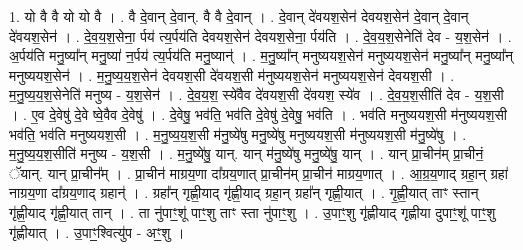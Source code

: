 \documentclass[17pt]{extarticle}
\begin{document}
1. यो वै वै यो यो वै । . वै दे॒वान् दे॒वान्. वै वै दे॒वान् । . दे॒वान् दे॑वयश॒सेन॑ देवयश॒सेन॑ दे॒वान् दे॒वान् दे॑वयश॒सेन॑ । . दे॒व॒य॒श॒सेना॒ र्पय॑ त्य॒र्पय॑ति देवयश॒सेन॑ देवयश॒सेना॒ र्पय॑ति । . दे॒व॒य॒श॒सेनेति॑ देव - य॒श॒सेन॑ । . अ॒र्पय॑ति मनु॒ष्या᳚न् मनु॒ष्या॑ न॒र्पय॑ त्य॒र्पय॑ति मनु॒ष्यान्॑ । . म॒नु॒ष्या᳚न् मनुष्ययश॒सेन॑ मनुष्ययश॒सेन॑ मनु॒ष्या᳚न् मनु॒ष्या᳚न् मनुष्ययश॒सेन॑ । . म॒नु॒ष्य॒य॒श॒सेन॑ देवयश॒सी दे॑वयश॒सी म॑नुष्ययश॒सेन॑ मनुष्ययश॒सेन॑ देवयश॒सी । . म॒नु॒ष्य॒य॒श॒सेनेति॑ मनुष्य - य॒श॒सेन॑ । . दे॒व॒य॒श॒ स्ये॑वैव दे॑वयश॒सी दे॑वयश॒ स्ये॑व । . दे॒व॒य॒श॒सीति॑ देव - य॒श॒सी । . ए॒व दे॒वेषु॑ दे॒वे ष्वे॒वैव दे॒वेषु॑ । . दे॒वेषु॒ भव॑ति॒ भव॑ति दे॒वेषु॑ दे॒वेषु॒ भव॑ति । . भव॑ति मनुष्ययश॒सी म॑नुष्ययश॒सी भव॑ति॒ भव॑ति मनुष्ययश॒सी । . म॒नु॒ष्य॒य॒श॒सी म॑नु॒ष्ये॑षु मनु॒ष्ये॑षु मनुष्ययश॒सी म॑नुष्ययश॒सी म॑नु॒ष्ये॑षु । . म॒नु॒ष्य॒य॒श॒सीति॑ मनुष्य - य॒श॒सी । . म॒नु॒ष्ये॑षु॒ यान्. यान् म॑नु॒ष्ये॑षु मनु॒ष्ये॑षु॒ यान् । . यान् प्रा॒चीन॑म् प्रा॒चीनं॒ ॅयान्. यान् प्रा॒चीन᳚म् । . प्रा॒चीन॑ माग्रय॒णा दा᳚ग्रय॒णात् प्रा॒चीन॑म् प्रा॒चीन॑ माग्रय॒णात् । . आ॒ग्र॒य॒णाद् ग्रहा॒न् ग्रहा॑ नाग्रय॒णा दा᳚ग्रय॒णाद् ग्रहान्॑ । . ग्रहा᳚न् गृह्णी॒याद् गृ॑ह्णी॒याद् ग्रहा॒न् ग्रहा᳚न् गृह्णी॒यात् । . गृ॒ह्णी॒यात् ताꣳ स्तान् गृ॑ह्णी॒याद् गृ॑ह्णी॒यात् तान् । . ता नु॑पाꣳ॒॒शू॑ पाꣳ॒॒शु ताꣳ स्ता नु॑पाꣳ॒॒शु । . उ॒पाꣳ॒॒शु गृ॑ह्णीयाद् गृह्णीया दुपाꣳ॒॒शू॑ पाꣳ॒॒शु गृ॑ह्णीयात् । . उ॒पाꣳ॒॒श्वित्यु॑प - अꣳ॒॒शु । \newline
\end{document}
